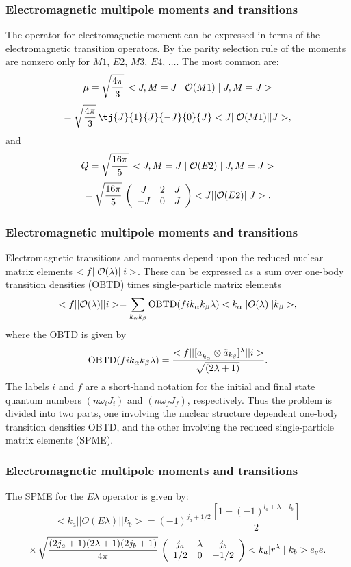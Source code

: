 \documentclass[compress]{beamer}
\begin{document}
\frame
{
\frametitle{Electromagnetic multipole moments and transitions}
\begin{small}
{\scriptsize
The operator for
electromagnetic moment can be expressed in terms of the
electromagnetic transition operators.
By the parity selection rule of the moments are nonzero
only for $  M1  $, $  E2  $, $  M3  $, $  E4  $, $  \ldots  $.
The most common are:
$$
\mu  = \sqrt{\frac{4\pi }{3}}\, <J,M=J\mid {\cal O}(M1)\mid J,M=J>
$$
$$
= \sqrt{\frac{4\pi }{3}}\,
\tj  {J}  {1}  {J}  {-J}  {0}  {J}
<J||{\cal O}(M1)||J>,
$$
and
$$
Q = \sqrt{\frac{16\pi }{5}}\, <J,M=J\mid {\cal O}(E2)\mid J,M=J>
$$
$$
= \sqrt{\frac{16\pi }{5}}\,
  \left(\begin{array}{ccc}  {J}&  {2} & {J}\\  {-J} & {0}&  {J}\end{array}\right)<J||{\cal O}(E2)||J>.
$$
}
\end{small}
}
\frame
{
\frametitle{Electromagnetic multipole moments and transitions}
\begin{small}
{\scriptsize
Electromagnetic transitions and moments depend upon the reduced nuclear
matrix elements $  <f||{\cal O}(\lambda )||i>  $. These can be expressed as a sum over one-body transition
densities (OBTD) times single-particle matrix elements
$$
<f||{\cal O}(\lambda )||i>
= \displaystyle\sum _{k_{\alpha } k_{\beta }} {\rm OBTD}(f i k_{\alpha } k_{\beta } \lambda )
 <k_{\alpha }||O(\lambda )||k_{\beta }>, 
$$
where the OBTD is given by
$$
{\rm OBTD}(f i k_{\alpha } k_{\beta } \lambda )
= { <f||[a^{+}_{k_{\alpha }}\otimes \tilde{a}_{k_{\beta }}]^{\lambda }||i>
\over  \sqrt{ (2\lambda +1)}\, }. 
$$
The labels $  i  $ and $  f  $ are a short-hand notation for the initial
and final state quantum numbers $  (n \omega _{i} J_{i})  $ and $  (n \omega _{f} J_{f})  $,
respectively. Thus the problem is divided into two parts, one
involving the nuclear structure dependent one-body transition
densities OBTD, and the other involving the reduced
single-particle matrix
elements (SPME).
}
\end{small}
}
\frame
{
\frametitle{Electromagnetic multipole moments and transitions}
\begin{small}
{\scriptsize
The SPME for the $  E\lambda   $ operator is given by:
\[
<k_{a}||O(E\lambda )||k_{b}>=
(-1)^{j_{a}+1/2}\frac{[1+(-1)^{l_{a}+\lambda +l_{b}}]}{2}
\]
\[
 \times\,   \sqrt{ {(2j_{a}+1)(2\lambda +1)(2j_{b}+1)\over4\pi }}\,
  \left(\begin{array}{ccc}  {j_{a}}&  {\lambda} &  {j_{b}}\\  {1/2} & {0}&  {-1/2}\end{array}\right)
<k_{a}|r^{\lambda }\mid k_{b}> e_{q} e.
\]
}
\end{small}
}
\end{document}
